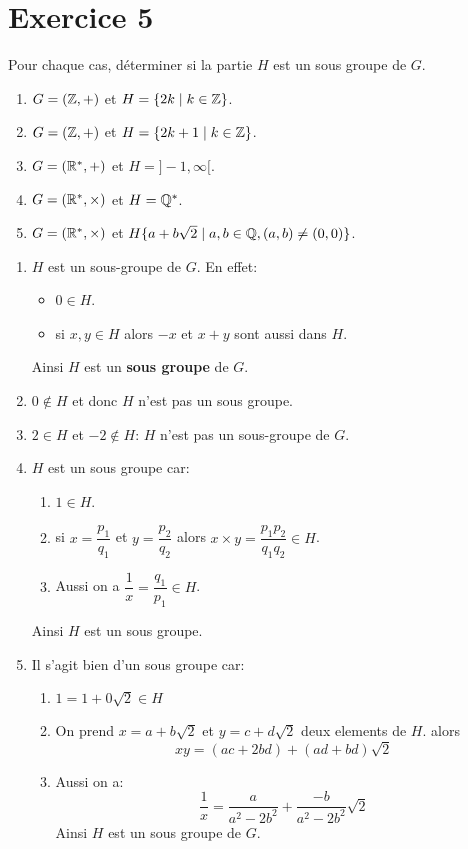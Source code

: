 \documentclass{report}
\begin{document}
\section{Exercice 5} %
\qs{}
{

Pour chaque cas,  déterminer si la partie $H$ est un sous groupe de $G$.

\begin{enumerate}
  \item $G = \left(\mathbb{Z},+\right)$ et $H =\{2k\;|\; k\in \mathbb{Z}\}$.
  \item $G = \left(\mathbb{Z},+\right)$ et $H =\{2k+1\;|\; k\in \mathbb{Z}\}$.
  \item $G = \left(\mathbb{R}^{*},+\right)$ et $H =]-1,\infty[$.
  \item $G = \left(\mathbb{R}^{*},\times\right)$ et $H =\mathbb{Q}^*$.
  \item $G = \left(\mathbb{R}^{*},\times\right)$ et $H \{a + b\sqrt{2}\;|\; a, b\in
    \mathbb{Q}, (a,b)\neq (0,0)\}$.
\end{enumerate}
}
\begin{myproof}
  \begin{enumerate}
    \item $H$ est un sous-groupe de $G$. En effet:
      \begin{itemize}
        \item $0 \in H$.
        \item si $x,y\in H$ alors $-x$ et $x+y$ sont aussi dans $H$.
      \end{itemize}
      Ainsi $H$ est un \textbf{sous groupe} de $G$.
    \item $0 \not\in H$ et donc $H$ n'est pas un sous groupe.
    \item $2 \in H$ et $-2\not\in H$: $H$ n'est pas un sous-groupe de $G$. 
    \item $H$ est un sous groupe car:
      \begin{enumerate}
        \item $1 \in H$.
        \item si $x = \dfrac{p_1}{q_1}$ et $y=\dfrac{p_2}{q_2}$ alors $x \times y = \dfrac{p_1p_2}{q_1q_2}\in H$.
        \item Aussi on a $\dfrac{1}{x} = \dfrac{q_1}{p_1} \in H$.
      \end{enumerate}
      Ainsi $H$ est un sous groupe.
    \item Il s'agit bien d'un sous groupe car:
      \begin{enumerate}
        \item $1 = 1 + 0\sqrt{2} \in H$
        \item On prend $x = a + b\sqrt{2}$ et $y= c + d\sqrt{2}$ deux elements de $H$.
          alors
          $$xy = (ac + 2bd ) + (ad + bd)\sqrt{2}$$
        \item Aussi on a:
          $$
          \dfrac{1}{x} = \dfrac{a}{a^2 - 2b^2} + \dfrac{-b}{a^2 - 2b^2}\sqrt{2}
          $$
          Ainsi $H$ est un sous groupe de $G$.
      \end{enumerate}

  \end{enumerate}
\end{myproof}
\end{document}
